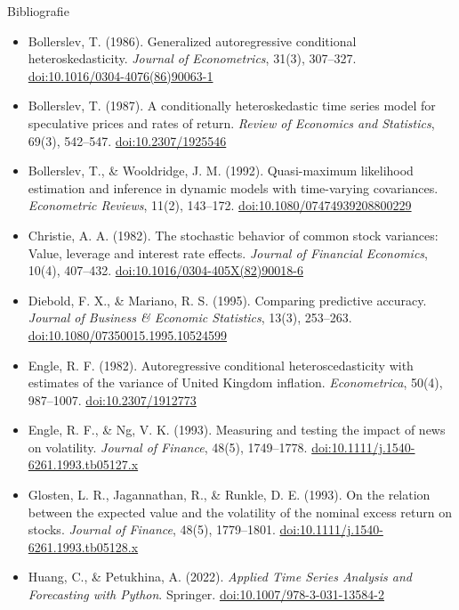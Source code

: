\begin{frame}{Bibliografie}
\itemsize{\tiny}
\begin{itemize}
    \item Bollerslev, T. (1986). Generalized autoregressive conditional heteroskedasticity. \textit{Journal of Econometrics}, 31(3), 307--327. \href{https://doi.org/10.1016/0304-4076(86)90063-1}{doi:10.1016/0304-4076(86)90063-1}
    \item Bollerslev, T. (1987). A conditionally heteroskedastic time series model for speculative prices and rates of return. \textit{Review of Economics and Statistics}, 69(3), 542--547. \href{https://doi.org/10.2307/1925546}{doi:10.2307/1925546}
    \item Bollerslev, T., \& Wooldridge, J. M. (1992). Quasi-maximum likelihood estimation and inference in dynamic models with time-varying covariances. \textit{Econometric Reviews}, 11(2), 143--172. \href{https://doi.org/10.1080/07474939208800229}{doi:10.1080/07474939208800229}
    \item Christie, A. A. (1982). The stochastic behavior of common stock variances: Value, leverage and interest rate effects. \textit{Journal of Financial Economics}, 10(4), 407--432. \href{https://doi.org/10.1016/0304-405X(82)90018-6}{doi:10.1016/0304-405X(82)90018-6}
    \item Diebold, F. X., \& Mariano, R. S. (1995). Comparing predictive accuracy. \textit{Journal of Business \& Economic Statistics}, 13(3), 253--263. \href{https://doi.org/10.1080/07350015.1995.10524599}{doi:10.1080/07350015.1995.10524599}
    \item Engle, R. F. (1982). Autoregressive conditional heteroscedasticity with estimates of the variance of United Kingdom inflation. \textit{Econometrica}, 50(4), 987--1007. \href{https://doi.org/10.2307/1912773}{doi:10.2307/1912773}
    \item Engle, R. F., \& Ng, V. K. (1993). Measuring and testing the impact of news on volatility. \textit{Journal of Finance}, 48(5), 1749--1778. \href{https://doi.org/10.1111/j.1540-6261.1993.tb05127.x}{doi:10.1111/j.1540-6261.1993.tb05127.x}
    \item Glosten, L. R., Jagannathan, R., \& Runkle, D. E. (1993). On the relation between the expected value and the volatility of the nominal excess return on stocks. \textit{Journal of Finance}, 48(5), 1779--1801. \href{https://doi.org/10.1111/j.1540-6261.1993.tb05128.x}{doi:10.1111/j.1540-6261.1993.tb05128.x}
    \item Huang, C., \& Petukhina, A. (2022). \textit{Applied Time Series Analysis and Forecasting with Python}. Springer. \href{https://doi.org/10.1007/978-3-031-13584-2}{doi:10.1007/978-3-031-13584-2}

\end{itemize}
\end{frame}
